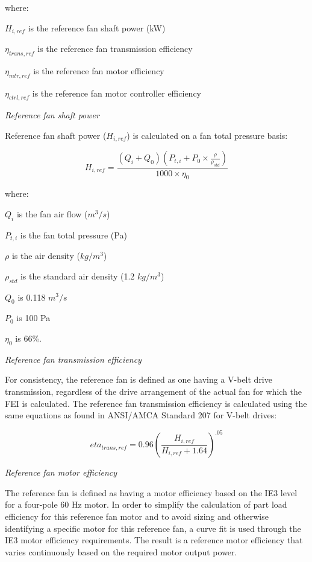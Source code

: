 where:

\(H_{i,ref}\) is the reference fan shaft power (kW)

\(\eta_{trans,ref}\) is the reference fan transmission efficiency

\(\eta_{mtr,ref}\) is the reference fan motor efficiency

\(\eta_{ctrl,ref}\) is the reference fan motor controller efficiency

\emph{Reference fan shaft power}

Reference fan shaft power (\(H_{i,ref}\)) is calculated on a fan total pressure basis:

\begin{equation}
H_{i,ref}=\frac{(Q_i + Q_0)(P_{t,i} + P_0 \times \frac{\rho}{\rho_{std}} )}{1000 \times \eta_0}
\label{eq:Href_calculation}
\end{equation}

where:

\(Q_i\) is the fan air flow (\(m^3/s\))

\(P_{t,i}\) is the fan total pressure (Pa)

\(\rho\) is the air density (\(kg/m^3\))

\(\rho_{std}\) is the standard air density (1.2 \(kg/m^3\))

\(Q_0\) is 0.118 \(m^3/s\)

\(P_0\) is 100 Pa

\(\eta_0\) is 66\%.

\emph{Reference fan transmission efficiency}

For consistency, the reference fan is defined as one having a V-belt drive transmission, regardless of the drive arrangement of the actual fan for which the FEI is calculated. The reference fan transmission efficiency is calculated using the same equations as found in ANSI/AMCA Standard 207 for V-belt drives:

\begin{equation}
eta_{trans,ref}=0.96(\frac{H_{i,ref}}{H_{i,ref}+1.64})^{.05}
\label{eq:eta_trans_calculation}
\end{equation}

\emph{Reference fan motor efficiency}

The reference fan is defined as having a motor efficiency based on the IE3 level for a four-pole 60 Hz motor. In order to simplify the calculation of part load efficiency for this reference fan motor and to avoid sizing and otherwise identifying a specific motor for this reference fan, a curve fit is used through the IE3 motor efficiency requirements. The result is a reference motor efficiency that varies continuously based on the required motor output power.

